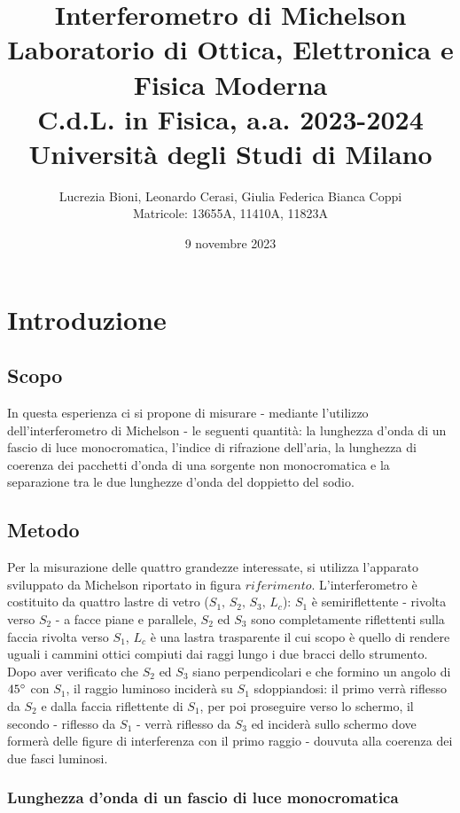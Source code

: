 \documentclass[]{article}
\title{%
    \Huge Interferometro di Michelson \\
    \Large Laboratorio di Ottica, Elettronica e Fisica Moderna \\ C.d.L. in Fisica, a.a. 2023-2024 \\ Università degli Studi di Milano}
\author{\LARGE Lucrezia Bioni, Leonardo Cerasi, Giulia Federica Bianca Coppi \\ Matricole: 13655A, 11410A, 11823A}
\date{9 novembre 2023}
\let\oldsection\section%
\renewcommand{\section}{%
	\renewcommand{\theequation}{\thesection.\arabic{equation}}%
	\oldsection}%
\let\oldsubsection\subsection%
\renewcommand{\subsection}{%
	\renewcommand{\theequation}{\thesubsection.\arabic{equation}}%
	\oldsubsection}%
\begin{document}
\maketitle

\section{Introduzione}

\subsection{Scopo}

In questa esperienza ci si propone di misurare - mediante l'utilizzo dell'interferometro di Michelson - le seguenti quantità: la lunghezza d'onda di un fascio di luce monocromatica, l'indice di rifrazione dell'aria, la lunghezza di coerenza dei pacchetti d'onda di una sorgente non monocromatica e la separazione tra le due lunghezze d'onda del doppietto del sodio.

\subsection{Metodo}

Per la misurazione delle quattro grandezze interessate, si utilizza l'apparato sviluppato da Michelson riportato in figura $riferimento$. L'interferometro è costituito da quattro lastre di vetro ($S_1, \, S_2, \, S_3, \, L_c$): $S_1$ è semiriflettente - rivolta verso $S_2$ - a facce piane e parallele, $S_2$ ed $S_3$ sono completamente riflettenti sulla faccia rivolta verso $S_1$, $L_c$ è una lastra trasparente il cui scopo è quello di rendere uguali i cammini ottici compiuti dai raggi lungo i due bracci dello strumento. \\ Dopo aver verificato che $S_2$ ed $S_3$ siano perpendicolari e che formino un angolo di $45\degree$ con $S_1$, il raggio luminoso inciderà su $S_1$ sdoppiandosi: il primo verrà riflesso da $S_2$ e dalla faccia riflettente di $S_1$, per poi proseguire verso lo schermo, il secondo - riflesso da $S_1$ - verrà riflesso da $S_3$ ed inciderà sullo schermo dove formerà delle figure di interferenza con il primo raggio - douvuta alla coerenza dei due fasci luminosi.

\subsubsection{Lunghezza d'onda di un fascio di luce monocromatica}
\end{document}
